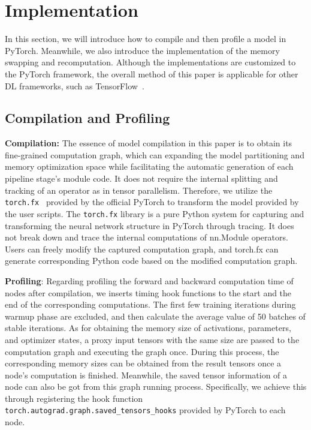 \section{Implementation}
\label{sec:imp}
In this section, we will introduce how to compile and then profile a model in PyTorch.
Meanwhile, we also introduce the implementation of the memory swapping and recomputation.
Although the implementations are customized to the PyTorch framework,
the overall method of this paper is applicable for other DL frameworks, such as TensorFlow~\cite{abadiTensorFlowSystemLargeScale2016}.

\subsection{Compilation and Profiling}
\textbf{Compilation:} The essence of model compilation in this paper is
to obtain its fine-grained computation graph,
which can expanding the model partitioning and memory optimization space
while facilitating the automatic generation of each pipeline stage's module code.
It does not require the internal splitting and
tracking of an operator as in tensor parallelism.
Therefore, we utilize the \texttt{torch.fx}~\cite{reedTorchFxPractical2022}
provided by the official PyTorch to transform the model provided by the user scripts.
The \texttt{torch.fx} library is a pure Python system for
capturing and transforming the neural network structure in PyTorch through tracing.
It does not break down and trace the internal computations of nn.Module operators.
Users can freely modify the captured computation graph,
and torch.fx can generate corresponding Python code based on the modified computation graph.

\textbf{Profiling}: Regarding profiling the forward and backward
computation time of nodes after compilation,
we inserts timing hook functions to the start and the end of the corresponding computations.
The first few training iterations during warmup phase are excluded,
and then calculate the average value of 50 batches of stable iterations.
As for obtaining the memory size of activations, parameters, and optimizer states,
a proxy input tensors with the same size are passed to the computation graph
and executing the graph once.
During this process, the corresponding memory sizes can be obtained
from the result tensors once a node's computation is finished.
Meanwhile, the saved tensor information of a node
can also be got from this graph running process.
Specifically, we achieve this through registering the hook function
\texttt{torch.autograd.graph.saved\_tensors\_hooks} provided by PyTorch to each node.

